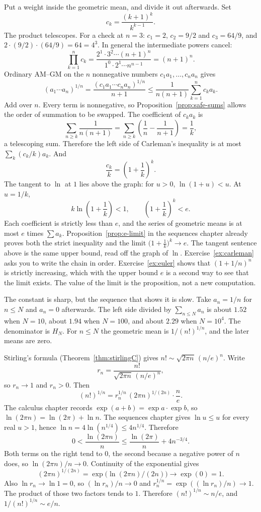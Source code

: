 Put a weight inside the geometric mean, and divide it out afterwards. Set
\[
c_k=\frac{(k+1)^k}{k^{k-1}}.
\]
The product telescopes. For a check at $n=3$: $c_1=2$, $c_2=9/2$ and $c_3=64/9$, and $2\cdot(9/2)\cdot(64/9)=64=4^3$. In general the intermediate powers cancel:
\[
\prod_{k=1}^nc_k=\frac{2^1\cdot3^2\cdots(n+1)^n}{1^0\cdot2^1\cdots n^{n-1}}=(n+1)^n.
\]
Ordinary AM--GM on the $n$ nonnegative numbers $c_1a_1,\dots,c_na_n$ gives
\[
(a_1\cdots a_n)^{1/n}=\frac{(c_1a_1\cdots c_na_n)^{1/n}}{n+1}\le\frac1{n(n+1)}\sum_{k=1}^nc_ka_k.
\]
Add over $n$. Every term is nonnegative, so Proposition~\ref{prop:safe-sums} allows the order of summation to be swapped. The coefficient of $c_ka_k$ is
\[
\sum_{n\ge k}\frac1{n(n+1)}=\sum_{n\ge k}\left(\frac1n-\frac1{n+1}\right)=\frac1k,
\]
a telescoping sum. Therefore the left side of Carleman's inequality is at most $\sum_k(c_k/k)a_k$. And
\[
\frac{c_k}k=\left(1+\frac1k\right)^k.
\]
The tangent to $\ln$ at $1$ lies above the graph: for $u>0$, $\ln(1+u)<u$. At $u=1/k$,
\[
k\ln\left(1+\frac1k\right)<1,\qquad\left(1+\frac1k\right)^k<e.
\]
Each coefficient is strictly less than $e$, and the series of geometric means is at most $e$ times $\sum a_k$. Proposition~\ref{prop:e-limit} in the sequences chapter already proves both the strict inequality and the limit $\bigl(1+\frac1k\bigr)^k\to e$. The tangent sentence above is the same upper bound, read off the graph of $\ln$. Exercise~\ref{ex:carleman} asks you to write the chain in order. Exercise~\ref{ex:euler} shows that $(1+1/n)^n$ is strictly increasing, which with the upper bound $e$ is a second way to see that the limit exists. The value of the limit is the proposition, not a new computation.

The constant is sharp, but the sequence that shows it is slow. Take $a_n=1/n$ for $n\le N$ and $a_n=0$ afterwards. The left side divided by $\sum_{n\le N}a_n$ is about $1.52$ when $N=10$, about $1.94$ when $N=100$, and about $2.29$ when $N=10^4$. The denominator is $H_N$. For $n\le N$ the geometric mean is $1/(n!)^{1/n}$, and the later means are zero.

Stirling's formula (Theorem~\ref{thm:stirlingC}) gives $n!\sim\sqrt{2\pi n}\,(n/e)^n$. Write
\[
r_n=\frac{n!}{\sqrt{2\pi n}\,(n/e)^n},
\]
so $r_n\to1$ and $r_n>0$. Then
\[
(n!)^{1/n}=r_n^{1/n}\,(2\pi n)^{1/(2n)}\cdot\frac n e.
\]
The calculus chapter records $\exp(a+b)=\exp a\cdot\exp b$, so $\ln(2\pi n)=\ln(2\pi)+\ln n$. The sequences chapter gives $\ln u\le u$ for every real $u>1$, hence $\ln n=4\ln(n^{1/4})\le 4n^{1/4}$. Therefore
\[
0<\frac{\ln(2\pi n)}n\le\frac{\ln(2\pi)}n+4n^{-3/4}.
\]
Both terms on the right tend to $0$, the second because a negative power of $n$ does, so $\ln(2\pi n)/n\to0$. Continuity of the exponential gives
\[
(2\pi n)^{1/(2n)}=\exp\bigl(\ln(2\pi n)/(2n)\bigr)\to\exp(0)=1.
\]
Also $\ln r_n\to\ln1=0$, so $(\ln r_n)/n\to0$ and $r_n^{1/n}=\exp((\ln r_n)/n)\to1$. The product of those two factors tends to $1$. Therefore $(n!)^{1/n}\sim n/e$, and $1/(n!)^{1/n}\sim e/n$.


